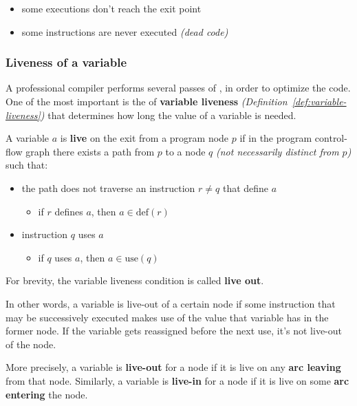 \documentclass[english]{article}
\begin{document}
\begin{itemize}
  \item some executions don't reach the exit point
  \item some instructions are never executed \textit{(dead code)}
\end{itemize}

\subsubsection{Liveness of a variable}

A professional compiler performs several passes of , in order to optimize the code.
One of the most important is the  of \textbf{variable liveness} \textit{(Definition~\ref{def:variable-liveness})} that determines how long the value of a variable is needed.

\begin{definition}
  \label{def:variable-liveness}
  A variable \(a\) is \textbf{live} on the exit from a program node \(p\) if in the program control-flow graph there exists a path from \(p\) to a node \(q\) \textit{(not necessarily distinct from \(p\))} such that:
  \begin{itemize}
    \item the path does not traverse an instruction \(r \neq q\) that define \(a\)
          \begin{itemize}[label=\(\rightarrow\)]
            \item if \(r\) defines \(a\), then \(a \in \text{def}\left(r\right)\)
          \end{itemize}
    \item instruction \(q\) uses \(a\)
          \begin{itemize}[label=\(\rightarrow\)]
            \item if \(q\) uses \(a\), then \(a \in \text{use}\left(q\right)\)
          \end{itemize}
  \end{itemize}
  For brevity, the variable liveness condition is called \textbf{live out}.
\end{definition}

In other words, a variable is live-out of a certain node if some instruction that may be successively executed makes use of the value that variable has in the former node.
If the variable gets reassigned before the next use, it's not live-out of the node.

More precisely, a variable is \textbf{live-out} for a node if it is live on any \textbf{arc leaving} from that node.
Similarly, a variable is \textbf{live-in} for a node if it is live on some \textbf{arc entering} the node.
\end{document}
